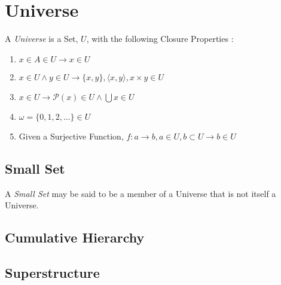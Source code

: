 \section{Universe}\label{sec:universe}

A \emph{Universe} is a Set, $U$, with the following Closure Properties
\cite{maclane69}:
\begin{enumerate}
\item $x \in A \in U \rightarrow x \in U$
\item $x \in U \wedge y \in U \rightarrow \{x,y\}, \langle x,y
  \rangle, x \times y \in U$
\item $x \in U \rightarrow \mathcal{P}(x) \in U \wedge \bigcup x \in U$
\item $\omega = \{0,1,2,\ldots\} \in U$
\item Given a Surjective Function, $f : a \rightarrow b, a \in
  U, b \subset U \rightarrow b \in U$
\end{enumerate}



\subsection{Small Set}\label{sec:small_set}

A \emph{Small Set} may be said to be a member of a Universe that is
not itself a Universe.



\subsection{Cumulative Hierarchy}\label{sec:cumulative_hierarchy}

\subsection{Superstructure}\label{sec:superstructure}

